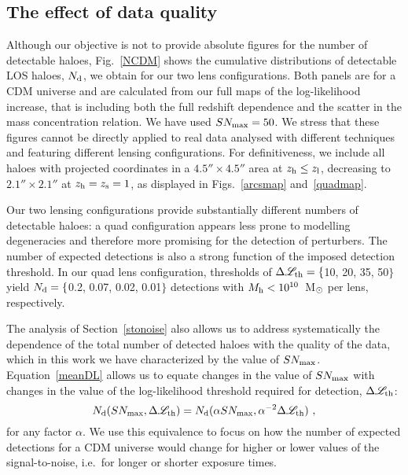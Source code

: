 \documentclass[a4paper, fleqn, usenatbib, useAMS]{mnras}
\def\DL{\Delta\mathscr{L}}
\begin{document}
\subsection{The effect of data quality}

Although our objective is not to provide absolute figures for the 
number of detectable haloes, Fig.~\ref{NCDM} shows the cumulative distributions
of detectable LOS haloes, $N_{\rm d}$, we obtain for our two lens configurations. Both panels
are for a CDM universe and are calculated from our full maps of the 
log-likelihood increase, that is including both the full redshift dependence 
and the scatter in the mass concentration relation. 
We have used $SN_{\rm max}=50$. We stress that these figures cannot be directly applied
to real data analysed with different techniques and featuring different
lensing configurations. For definitiveness, we include all haloes with projected
coordinates in a $4.5''\times4.5''$ area at $z_{\rm h}\leq z_{\rm l}$, decreasing
to $2.1''\times2.1''$ at $z_{\rm h}=z_{\rm s}=1$, as displayed in Figs.~\ref{arcsmap} and~\ref{quadmap}.

Our two lensing configurations provide substantially different 
numbers of detectable haloes: a quad configuration appears less prone
to modelling degeneracies and therefore more promising for the detection
of perturbers. The number of expected detections is also a strong function of
the imposed detection threshold. 
In our quad lens configuration, thresholds of $\DL_{\rm th}=\{$10, 20, 35, 50$\}$ yield $N_{\rm d}=\{$0.2, 0.07, 0.02, 0.01$\}$ detections with $M_{\rm h}<10^{10}$~M$_{\rm \odot}$ 
per lens, respectively. 

The analysis of Section~\ref{stonoise} also allows us to address systematically
the dependence of the total number of detected haloes with the quality
of the 
data, which in this work we have characterized by the value of 
$SN_{\rm max}$. Equation~\ref{meanDL}
allows us to equate changes in the value of $SN_{\rm max}$ with 
changes in the value of the log-likelihood threshold required for 
detection, $\DL_{\rm th}$: 
%
\begin{equation}
N_{\rm d}(SN_{\rm max}, \DL_{\rm th}) = N_{\rm d}(\alpha SN_{\rm max}, \alpha^{-2}\DL_{\rm th})\ ,
\label{snchange}
\end{equation}
%
for any factor $\alpha$. 
We use this equivalence to focus on how 
the number of expected detections for a CDM universe would change
for higher or lower values of the signal-to-noise, i.e.\ for longer or shorter 
exposure times.
\end{document}
